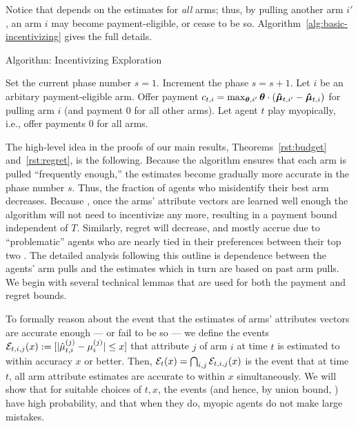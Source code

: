 Notice that  depends on the estimates for \emph{all}
arms; thus, by pulling another arm $i'$, an arm $i$ may become
payment-eligible, or cease to be so.
Algorithm~\ref{alg:basic-incentivizing} gives the full details.


\begin{algorithm}
\caption{Algorithm: Incentivizing Exploration \label{alg:basic-incentivizing}}
\begin{algorithmic}
\STATE Set the current phase number $s = 1$.
\STATE Increment the phase $s = s + 1$.
\ENDIF
{}
\STATE Let $i$ be an arbitary payment-eligible arm.
\STATE Offer payment
$c_{t,i} = \max_{\bm{\theta},i'} \bm{\theta} \cdot (\bm{\hat{\mu}}_{t,i'} - \bm{\hat{\mu}}_{t,i})$
for pulling arm $i$
(and payment 0 for all other arms).
\ELSE
\STATE Let agent $t$ play myopically, i.e., offer payments 0 for all arms.
\ENDIF
\ENDFOR
\end{algorithmic}
\end{algorithm}

The high-level idea in the proofs of our main results, Theorems~\ref{rst:budget} and~\ref{rst:regret},
is the following.
Because the algorithm ensures that each arm is pulled
``frequently enough,''
the estimates  become gradually more accurate in the
phase number $s$.
Thus, the fraction of agents who misidentify their best arm decreases.
Because , 
once the arms' attribute vectors are learned well enough
the algorithm will not need to incentivize any more,
resulting in a payment bound independent of $T$.
Similarly,  regret will decrease, and mostly accrue
due to ``problematic'' agents who are nearly tied in their preferences
between their top two .
The detailed analysis following this outline is 
dependence between the agents' arm pulls and the
estimates which in turn are based on past arm pulls.
We begin with several technical lemmas that are used for both the
payment and regret bounds.

To formally reason about the event that the estimates of arms'
attributes vectors are accurate enough --- or fail to be so ---
we define the events
${\mathcal E}_{t,i,j}(x) := [|\hat{\mu}_{t,i}^{(j)} - \mu_{i}^{(j)}| \leq x]$
that attribute $j$ of arm $i$ at time $t$ is estimated to
within accuracy $x$ or better.
Then, 
${\mathcal E}_{t}(x) = \bigcap_{i,j} {\mathcal E}_{t,i,j}(x)$
is the event that at time $t$, all arm attribute
estimates are accurate to within $x$ simultaneously.
We will show that for suitable choices of $t, x$,
the events 
(and hence, by  union bound, )
have high probability,
and that when they do, myopic agents do not make large mistakes.



